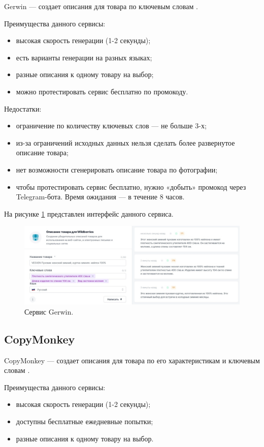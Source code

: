\documentclass[a4paper,12pt]{extarticle}
\begin{document}
Gerwin — создает описания для товара по ключевым словам \cite{gerwin}.

Преимущества данного сервисы:
\begin{itemize}
	\item высокая скорость генерации (1-2 секунды);
	\item есть варианты генерации на разных языках;
	\item разные описания к одному товару на выбор;
	\item можно протестировать сервис бесплатно по промокоду.
\end{itemize}

Недостатки:
\begin{itemize}
	\item ограничение по количеству ключевых слов — не больше 3-х;
	\item из-за ограничений исходных данных нельзя сделать более развернутое описание товара;
	\item нет возможности сгенерировать описание товара по фотографии;
	\item чтобы протестировать сервис бесплатно, нужно «добыть» промокод через Telegram-бота. Время ожидания — в течение 8 часов.
\end{itemize}

На рисунке \ref{fig:gerwin} представлен интерфейс данного сервиса.

\begin{figure}[ht]
	\centering
	\includegraphics[scale=0.15]{gerwin.png}
	\caption{Сервис Gerwin.}
	\label{fig:gerwin}
\end{figure}

\newpage
\subsection{CopyMonkey}

CopyMonkey — создает описания для товара по его характеристикам и ключевым словам \cite{copymonkey}.

Преимущества данного сервисы:
\begin{itemize}
	\item высокая скорость генерации (1-2 секунды);
	\item доступны бесплатные ежедневные попытки;
	\item разные описания к одному товару на выбор.
\end{itemize}
\end{document}
